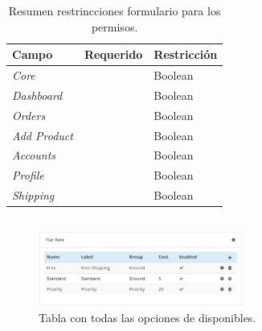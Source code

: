 \begin{table}[H]
    \centering
	\begin{tabular}{ |l|c||l| }
		\hline Campo & Requerido & Restricción \\ \hline
		\multirow{1}{*}{\textit{Core}} 			&  \checkmark 	& Boolean \\ \hline
		\multirow{1}{*}{\textit{Dashboard}} 	&  \checkmark	& Boolean \\ \hline
		\multirow{1}{*}{\textit{Orders}} 		&  \checkmark	& Boolean \\ \hline
		\multirow{1}{*}{\textit{Add Product}} 	&  \checkmark	& Boolean \\ \hline
		\multirow{1}{*}{\textit{Accounts}} 		&  \checkmark	& Boolean \\ \hline
		\multirow{1}{*}{\textit{Profile}} 		&  \checkmark	& Boolean \\ \hline
		\multirow{1}{*}{\textit{Shipping}} 		&  \checkmark	& Boolean \\ \hline
	\end{tabular}
 	\caption{Resumen restrincciones formulario para los permisos.}
    \label{tab:dashboard:account:form:restrictions:account}
\end{table}


\subsection{\shippingEF}

\begin{figure}[H]
	\centering
	\includegraphics[width=0.6\textwidth]{figuras/dashboard/shipping/shipping_options.png}
	\caption{Tabla con todas las opciones de \shippingEF disponibles.}
	\label{figure:dashboard:shipping:shipping_options}
\end{figure}

